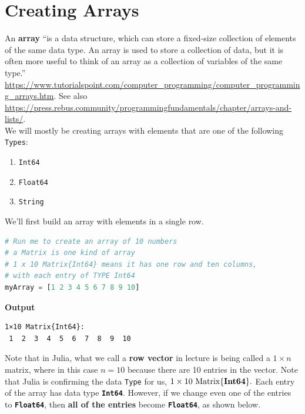 \begin{center}
\end{center}

\section{Creating Arrays}

An \textbf{array} ``is a data structure, which can store a fixed-size collection of elements of the same data type. An array is used to store a collection of data, but it is often more useful to think of an array as a collection of variables of the same type.'' \url{https://www.tutorialspoint.com/computer_programming/computer_programming_arrays.htm}. See also \url{https://press.rebus.community/programmingfundamentals/chapter/arrays-and-lists/}.\\

We will mostly be creating arrays with elements that are one of the following \texttt{Types}:
\begin{enumerate}
        \renewcommand{\labelenumi}{(\alph{enumi})}
        \setlength{\itemsep}{.1cm}
    \item \texttt{Int64}
    \item \texttt{Float64}
    \item \texttt{String}
\end{enumerate}

We'll first build an array with elements in a single row. 
\begin{lstlisting}[language=Julia,style=mystyle]
# Run me to create an array of 10 numbers
# a Matrix is one kind of array
# 1 x 10 Matrix{Int64} means it has one row and ten columns, 
# with each entry of TYPE Int64
myArray = [1 2 3 4 5 6 7 8 9 10]
\end{lstlisting}
\textbf{Output} 
\begin{verbatim}
1×10 Matrix{Int64}:
 1  2  3  4  5  6  7  8  9  10
\end{verbatim}

Note that in Julia, what we call a \textbf{row vector} in lecture is being called a $1 \times n$ matrix, where in this case $n=10$ because there are 10 entries in the vector. Note that Julia is confirming the data \texttt{Type} for us, $ 1 \times 10 ~\text{\rm  Matrix}\{\bf Int64\}.$ Each entry of the array has data type \texttt{\bf Int64}. However, if we change even one of the entries to \texttt{\bf Float64}, then \textbf{all of the entries} become \texttt{\bf Float64}, as shown below.

